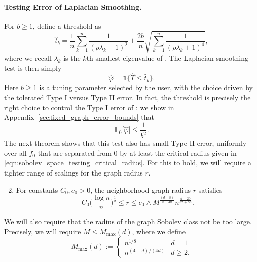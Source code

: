 \documentclass[twoside]{article}
\newcommand{\1}{\mathbf{1}}
\newcommand{\Lap}{L}
\newcommand{\Ebb}{\mathbb{E}}
\newcommand{\wh}[1]{\widehat{#1}}
\theoremstyle{definition}
\theoremstyle{remark}
\begin{document}
\paragraph{Testing Error of Laplacian Smoothing.}

For $b \geq 1$, define a threshold \smash{$\wh{t}_b$} as
\begin{equation*}
\wh{t}_{b} = \frac{1}{n}\sum_{k = 1}^{n} \frac{1}{(\rho \lambda_k + 1)^2} + \frac{2b}{n}\sqrt{\sum_{k = 1}^{n} \frac{1}{(\rho \lambda_k + 1)^4}},
\end{equation*}
where we recall $\lambda_k$ is the $k$th smallest eigenvalue of \smash{$\Lap_{n,r}$}. The Laplacian smoothing test is then simply
\begin{equation*}
\wh{\varphi} = \1\bigl\{\wh{T} \leq \wh{t}_b\bigr\}.
\end{equation*} 
Here $b \geq 1$ is a tuning parameter selected by the user, with the choice driven by the tolerated Type I versus Type II error. In fact, the threshold \smash{$\wh{t}_b$} is precisely the right choice to control the Type I error of \smash{$\wh{\varphi}$}: we show in Appendix~\ref{sec:fixed_graph_error_bounds} that
\begin{equation}
\label{eqn:type_I_error}
\Ebb_0\bigl[\wh{\varphi}\bigr] \leq \frac{1}{b^2}.
\end{equation}
The next theorem shows that this test also has small Type II error, uniformly over all $f_0$ that are separated from $0$ by at least the critical radius given in \eqref{eqn:sobolev_space_testing_critical_radius}. For this to hold, we will require a tighter range of scalings for the graph radius $r$.
\begin{enumerate}[label=(R\arabic*)]
	\setcounter{enumi}{1}
	\item 
	\label{asmp:ls_kernel_radius_testing}
	For constants $C_0,c_0>0$, the neighborhood graph radius $r$ satisfies
	\begin{equation*}
	C_0\biggl(\frac{\log n}{n}\biggr)^{\frac{1}{d}} \leq r \leq c_0 \wedge M^{\frac{(d - 8)}{8 + 2d}} n^{\frac{d - 20}{32 + 8d}}.
	\end{equation*}
\end{enumerate}
We will also require that the radius of the graph Sobolev class not be too large. Precisely, we will require $M \leq M_{\max}(d)$, where we define
\begin{equation*}
M_{\max}(d) :=
\begin{cases*}
n^{1/8} & \textrm{$d = 1$} \\
n^{(4 - d)/(4d)} & \textrm{$d \geq 2$}.
\end{cases*}
\end{equation*}
\end{document}
